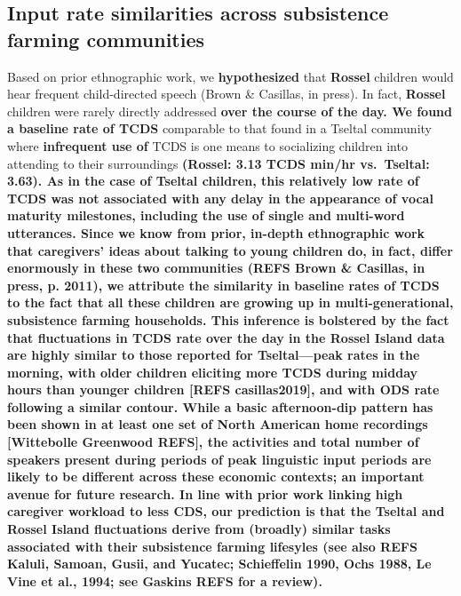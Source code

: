 \documentclass[,man,floatsintext]{apa6}
\begin{document}
\subsection{\texorpdfstring{\textbf{Input rate similarities across
subsistence farming
communities}}{Input rate similarities across subsistence farming communities}}\label{input-rate-similarities-across-subsistence-farming-communities}

Based on prior ethnographic work, we \textbf{hypothesized} that
\textbf{Rossel} children would hear frequent child-directed speech
(Brown \& Casillas, in press). In fact, \textbf{Rossel} children were
rarely directly addressed \textbf{over the course of the day. We found a
baseline rate of TCDS} comparable to that found in a Tseltal community
where \textbf{infrequent use of} TCDS is one means to socializing
children into attending to their surroundings \textbf{(Rossel: 3.13 TCDS
min/hr vs.~Tseltal: 3.63). As in the case of Tseltal children, this
relatively low rate of TCDS was not associated with any delay in the
appearance of vocal maturity milestones, including the use of single and
multi-word utterances. Since we know from prior, in-depth ethnographic
work that caregivers' ideas about talking to young children do, in fact,
differ enormously in these two communities (REFS Brown \& Casillas, in
press, p. 2011), we attribute the similarity in baseline rates of TCDS
to the fact that all these children are growing up in
multi-generational, subsistence farming households. This inference is
bolstered by the fact that fluctuations in TCDS rate over the day in the
Rossel Island data are highly similar to those reported for
Tseltal---peak rates in the morning, with older children eliciting more
TCDS during midday hours than younger children {[}REFS casillas2019{]},
and with ODS rate following a similar contour. While a basic
afternoon-dip pattern has been shown in at least one set of North
American home recordings {[}Wittebolle Greenwood REFS{]}, the activities
and total number of speakers present during periods of peak linguistic
input periods are likely to be different across these economic contexts;
an important avenue for future research. In line with prior work linking
high caregiver workload to less CDS, our prediction is that the Tseltal
and Rossel Island fluctuations derive from (broadly) similar tasks
associated with their subsistence farming lifesyles (see also REFS
Kaluli, Samoan, Gusii, and Yucatec; Schieffelin 1990, Ochs 1988, Le Vine
et al., 1994; see Gaskins REFS for a review).}
\end{document}
